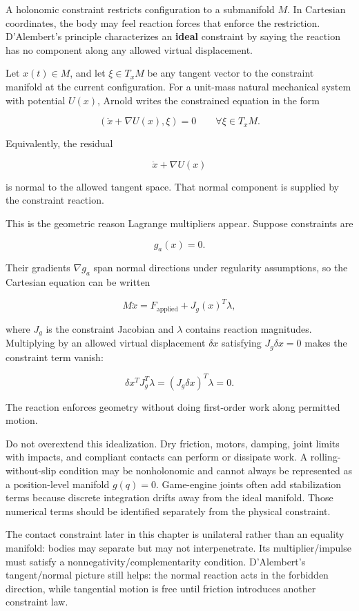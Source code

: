 A holonomic constraint restricts configuration to a submanifold \(M\). In Cartesian coordinates, the body may feel reaction forces that enforce the restriction. D'Alembert's principle characterizes an \textbf{ideal} constraint by saying the reaction has no component along any allowed virtual displacement.

Let \(x(t)\in M\), and let \(\xi\in T_xM\) be any tangent vector to the constraint manifold at the current configuration. For a unit-mass natural mechanical system with potential \(U(x)\), Arnold writes the constrained equation in the form

\[
\left(
\ddot x+\nabla U(x),
\xi
\right)
=
0
\qquad
\forall \xi\in T_xM.
\]

Equivalently, the residual

\[
\ddot x+\nabla U(x)
\]

is normal to the allowed tangent space. That normal component is supplied by the constraint reaction.

This is the geometric reason Lagrange multipliers appear. Suppose constraints are

\[
g_a(x)=0.
\]

Their gradients \(\nabla g_a\) span normal directions under regularity assumptions, so the Cartesian equation can be written

\[
M\ddot x
=
F_{\mathrm{applied}}
+
J_g(x)^T\lambda,
\]

where \(J_g\) is the constraint Jacobian and \(\lambda\) contains reaction magnitudes. Multiplying by an allowed virtual displacement \(\delta x\) satisfying \(J_g\delta x=0\) makes the constraint term vanish:

\[
\delta x^T J_g^T\lambda
=
(J_g\delta x)^T\lambda
=
0.
\]

The reaction enforces geometry without doing first-order work along permitted motion.

Do not overextend this idealization. Dry friction, motors, damping, joint limits with impacts, and compliant contacts can perform or dissipate work. A rolling-without-slip condition may be nonholonomic and cannot always be represented as a position-level manifold \(g(q)=0\). Game-engine joints often add stabilization terms because discrete integration drifts away from the ideal manifold. Those numerical terms should be identified separately from the physical constraint.

The contact constraint later in this chapter is unilateral rather than an equality manifold: bodies may separate but may not interpenetrate. Its multiplier/impulse must satisfy a nonnegativity/complementarity condition. D'Alembert's tangent/normal picture still helps: the normal reaction acts in the forbidden direction, while tangential motion is free until friction introduces another constraint law.

